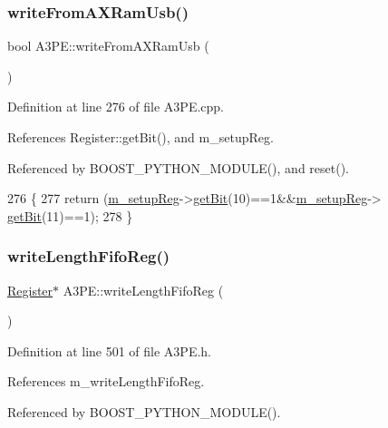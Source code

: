 \subsubsection{\texorpdfstring{write\+From\+A\+X\+Ram\+Usb()}{writeFromAXRamUsb()}}
{\footnotesize\ttfamily bool A3\+P\+E\+::write\+From\+A\+X\+Ram\+Usb (\begin{DoxyParamCaption}{ }\end{DoxyParamCaption})}



Definition at line 276 of file A3\+P\+E.\+cpp.



References Register\+::get\+Bit(), and m\+\_\+setup\+Reg.



Referenced by B\+O\+O\+S\+T\+\_\+\+P\+Y\+T\+H\+O\+N\+\_\+\+M\+O\+D\+U\+L\+E(), and reset().


\begin{DoxyCode}
276                             \{
277   \textcolor{keywordflow}{return} (\hyperlink{classA3PE_a142fa10b7e705c4701ae21678ec2ec8a}{m\_setupReg}->\hyperlink{classRegister_a5d27c9ff548817eee097ba4fdc8e8f69}{getBit}(10)==1&&\hyperlink{classA3PE_a142fa10b7e705c4701ae21678ec2ec8a}{m\_setupReg}->
      \hyperlink{classRegister_a5d27c9ff548817eee097ba4fdc8e8f69}{getBit}(11)==1);
278 \}
\end{DoxyCode}
\mbox{\label{classA3PE_a3b75531731fc939206cce076f7ac9f9a}} 
\subsubsection{\texorpdfstring{write\+Length\+Fifo\+Reg()}{writeLengthFifoReg()}}
{\footnotesize\ttfamily \hyperlink{classRegister}{Register}$\ast$ A3\+P\+E\+::write\+Length\+Fifo\+Reg (\begin{DoxyParamCaption}{ }\end{DoxyParamCaption})\hspace{0.3cm}{\ttfamily [inline]}}



Definition at line 501 of file A3\+P\+E.\+h.



References m\+\_\+write\+Length\+Fifo\+Reg.



Referenced by B\+O\+O\+S\+T\+\_\+\+P\+Y\+T\+H\+O\+N\+\_\+\+M\+O\+D\+U\+L\+E().


